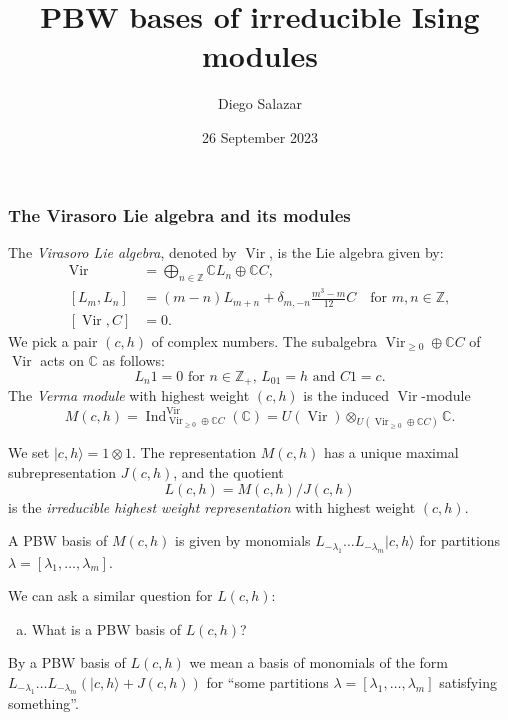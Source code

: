 \documentclass{beamer}
\title{PBW bases of irreducible Ising modules}
\author{Diego Salazar}
\institute[IMPA]
{
  Instituto de Matemática Pura e Aplicada (IMPA) \\
  Rio de Janeiro -- Brasil \\ [1cm]
}
\date[26 September 2023]{26 September 2023}
\DeclareMathOperator{\Vir}{Vir}
\DeclareMathOperator{\Ind}{Ind}
\begin{document}
\maketitle

\begin{frame}
  \frametitle{The Virasoro Lie algebra and its modules}

  The \emph{Virasoro Lie algebra}, denoted by $\Vir$, is the Lie algebra given by:
  \begin{align*}
    \Vir &= \bigoplus_{n \in \mathbb{Z}}\mathbb{C}L_n \oplus \mathbb{C}C, \\
    [L_m, L_n] &= (m - n)L_{m + n} + \delta_{m, -n}\frac{m^3 - m}{12}C \quad \text{for $m, n \in \mathbb{Z}$}, \\
    [\Vir, C] &= 0.
  \end{align*}
  We pick a pair $(c, h)$ of complex numbers.
  The subalgebra $\Vir_{\ge 0} \oplus \mathbb{C}C$ of $\Vir$ acts on $\mathbb{C}$ as follows:
  \begin{equation*}
    \text{$L_n1 = 0$ for $n \in \mathbb{Z}_+$, $L_01 = h$ and $C1 = c$}.
  \end{equation*}
  The \emph{Verma module} with highest weight $(c, h)$ is the induced $\Vir$-module
  \begin{equation*}
    M(c, h) = \Ind^{\Vir}_{\Vir_{\ge 0} \oplus \mathbb{C}C}(\mathbb{C}) = U(\Vir) \otimes_{U(\Vir_{\ge 0} \oplus \mathbb{C}C)} \mathbb{C}.
  \end{equation*}

\end{frame}

\begin{frame}

  We set $|c, h\rangle = 1\otimes1$.
  The representation $M(c, h)$ has a unique maximal subrepresentation $J(c, h)$, and the quotient
  \begin{equation*}
    L(c, h) = M(c, h)/J(c, h)
  \end{equation*}
  is the \emph{irreducible highest weight representation} with highest weight $(c, h)$.

  \begin{theorem}
    \label{thr:1}
    A PBW basis of $M(c, h)$ is given by monomials $L_{-\lambda_1}\dots L_{-\lambda_m}|c, h\rangle$ for partitions $\lambda = [\lambda_1, \dots, \lambda_m]$.
  \end{theorem}

  We can ask a similar question for $L(c, h)$:
  \begin{enumerate}[(a)]
  \item What is a PBW basis of $L(c, h)$?
  \end{enumerate}
  By a PBW basis of $L(c, h)$ we mean a basis of monomials of the form $L_{-\lambda_1}\dots L_{-\lambda_m}(|c, h\rangle + J(c, h))$ for ``some partitions $\lambda = [\lambda_1, \dots, \lambda_m]$ satisfying something''.
\end{frame}
\end{document}
